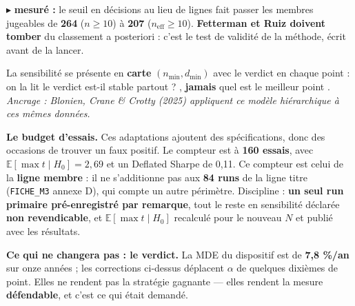 \documentclass[11pt,a4paper]{article}
\newcommand{\mes}[1]{{\color{rouge}\small$\blacktriangleright$ \textbf{mesuré :} #1}\par}
\begin{document}
\mes{le seuil en décisions au lieu de lignes fait passer les membres jugeables de \textbf{264} ($n \ge 10$) à
\textbf{207} ($n_{\text{eff}} \ge 10$). \textbf{Fetterman et Ruiz doivent tomber} du classement a posteriori : c'est le test
de validité de la méthode, écrit avant de la lancer.}

{\small La sensibilité se présente en \textbf{carte} $(n_{\min}, d_{\min})$ avec le verdict en chaque point : on la lit
\og le verdict est-il stable partout ? \fg{}, \textbf{jamais} \og quel est le meilleur point \fg{}.
\emph{Ancrage : Blonien, Crane \& Crotty (2025) appliquent ce modèle hiérarchique à ces mêmes données.}}

\vspace{2mm}
\begin{mdframed}[linecolor=rouge, backgroundcolor=rouge!5, linewidth=0.7pt, roundcorner=3pt]
\textbf{Le budget d'essais.} Ces adaptations ajoutent des spécifications, donc des occasions de trouver un faux
positif. Le compteur est à \textbf{160 essais}, avec $\mathbb{E}[\max t \mid H_0] = 2{,}69$ et un Deflated Sharpe de 0,11.
Ce compteur est celui de la \textbf{ligne membre} : il ne s'additionne pas aux \textbf{84 runs} de la ligne
titre (\texttt{FICHE\_M3} annexe D), qui compte un autre périmètre.
Discipline : \textbf{un seul run primaire pré-enregistré par remarque}, tout le reste en sensibilité déclarée
\textbf{non revendicable}, et $\mathbb{E}[\max t \mid H_0]$ recalculé pour le nouveau $N$ et publié avec les résultats.

\vspace{1mm}
\textbf{Ce qui ne changera pas : le verdict.} La MDE du dispositif est de \textbf{7,8 \%/an} sur onze années ; les
corrections ci-dessus déplacent $\alpha$ de quelques dixièmes de point. Elles ne rendent pas la stratégie
gagnante --- elles rendent la mesure \textbf{défendable}, et c'est ce qui était demandé.
\end{mdframed}
\end{document}
